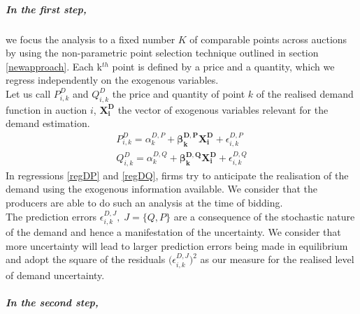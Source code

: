 
\subparagraph{In the first step,} 
\label{firststepresiduals}
we focus the analysis to a fixed number $K$ of comparable points across auctions by using the non-parametric point selection technique outlined in section \ref{newapproach}. 
Each k$^{th}$ point is defined by a price and a quantity, which we regress independently on the exogenous variables. \\%

Let us call $P_{i,k}^D$ and $Q_{i,k}^D$ the price and quantity of point $k$ of the realised demand function in auction $i$, $\boldsymbol{X^D_i}$ the vector of exogenous variables relevant for the demand estimation.
\begin{eqnarray}
P_{i,k}^D=\alpha_{k}^{D,P}+{\boldsymbol{\beta_{k}^{D,P}}} \boldsymbol{X^D_i}+\epsilon_{i,k}^{D,P} \label{regDP}\\
Q_{i,k}^D=\alpha_{k}^{D,Q}+{\boldsymbol{\beta_{k}^{D,Q}}} \boldsymbol{X^D_i}+\epsilon_{i,k}^{D,Q} \label{regDQ}
\end{eqnarray}
In regressions \ref{regDP} and \ref{regDQ}, firms try to anticipate the realisation of the demand using the exogenous information available. We consider that the producers are able to do such an analysis at the time of bidding. \\%

The prediction errors  $\epsilon_{i,k}^{D,J}, \; J=\{Q, P\}$ are a consequence of the stochastic nature of the demand and hence a manifestation of the uncertainty. We consider that more uncertainty will lead to larger prediction errors being made in equilibrium and adopt the 
square
of the residuals $ \bigl( \epsilon_{i,k}^{D,J} \bigr)^2$ as our measure for the realised level of demand uncertainty.



\subparagraph{In the second step,} 
\label{secondstepresiduals}

